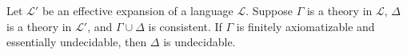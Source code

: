 Let $\mathcal{L}'$ be an effective expansion of a language $\mathcal{L}$. Suppose $\Gamma$ is a theory in $\mathcal{L}$, $\Delta$ is a theory in $\mathcal{L}'$, and $\Gamma \cup \Delta$ is consistent. If $\Gamma$ is finitely axiomatizable and essentially undecidable, then $\Delta$ is undecidable.
